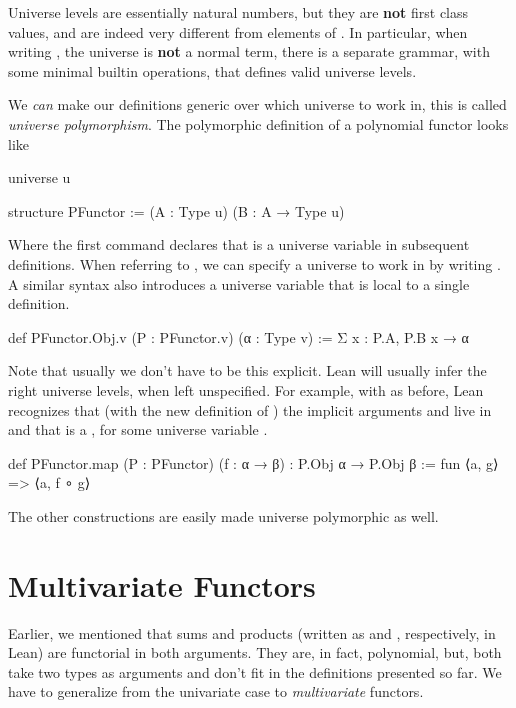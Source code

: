 Universe levels are essentially natural numbers, but they are \textbf{not} first class values, and are indeed very different from elements of .
In particular, when writing , the universe  is \textbf{not} a normal term, there is a separate grammar, with some minimal builtin operations, that defines valid universe levels.

We \emph{can} make our definitions generic over which universe to work in, this is called \emph{universe polymorphism}. The polymorphic definition of a polynomial functor looks like
\begin{leancode}
    universe u

    structure PFunctor := (A : Type u) (B : A → Type u)
\end{leancode}
Where the first command declares that  is a universe variable in subsequent definitions.
When referring to , we can specify a universe to work in by writing . A similar syntax also introduces a universe variable that is local to a single definition.

\begin{leancode}
    def PFunctor.Obj.{v} (P : PFunctor.{v}) (α : Type v)
        := Σ x : P.A, P.B x → α
\end{leancode}

Note that usually we don't have to be this explicit. Lean will usually infer the right universe levels, when left unspecified.
For example, with  as before, Lean recognizes that (with the new definition of ) the implicit arguments  and  live in  and that  is a , for some universe variable .
\begin{leancode}
    def PFunctor.map (P : PFunctor) (f : α → β) : P.Obj α → P.Obj β 
        := fun ⟨a, g⟩ => ⟨a, f ∘ g⟩    
\end{leancode}

The other constructions are easily made universe polymorphic as well.








\section{Multivariate Functors}
\label{sec:mvfunctor}

Earlier, we mentioned that sums and products (written as  and , respectively, in Lean) are functorial in both arguments.
They are, in fact, polynomial, but, both take two types as arguments and don't fit in the definitions presented so far. We have to generalize from the univariate case to \emph{multivariate} functors.

